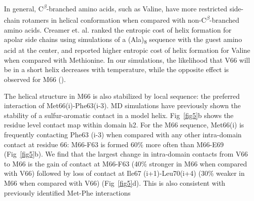 \documentclass[10pt,letterpaper]{article}
\begin{document}
In general, C\textsuperscript{$\beta$}-branched amino acids, such as Valine, have more restricted side-chain rotamers in helical conformation when compared with non-C\textsuperscript{$\beta$}-branched amino acids. Creamer et. al. ranked the entropic cost of helix formation for apolar side chains using simulations of a (Ala)\textsubscript{8} sequence with the guest amino acid at the center, and reported higher entropic cost of helix formation for Valine when compared with Methionine\cite{Creamer1992}. In our simulations, the likelihood that V66 will be in a short helix decreases with temperature, while the opposite effect is observed for M66 ().
 
The helical structure in M66 is also stabilized by local sequence: the preferred interaction of Met66(i)-Phe63(i-3). MD simulations have previously shown the stability of a sulfur-aromatic contact in a model helix\cite{Viguera1995}. Fig~\ref{fig5}b shows the residue level contact map within domain h2. For the M66 sequence, Met66(i) is frequently contacting Phe63 (i-3) when compared with any other intra-domain contact at residue 66: M66-F63 is formed 60\% more often than M66-E69 (Fig~\ref{fig5}b). We find that the largest change in intra-domain contacts from V66 to M66 is the gain of contact at M66-F63 (40\% stronger in M66 when compared with V66) followed by loss of contact at Ile67 (i+1)-Leu70(i+4) (30\% weaker in M66 when compared with V66) (Fig~\ref{fig5}d). This is also consistent with previously identified Met-Phe interactions\cite{Viguera1995,Faure2008,Valley2012,Gomez-Tamayo2016}

 
\end{document}
